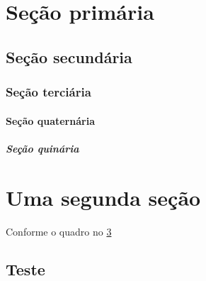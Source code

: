 \documentclass[
    12pt, %
    oneside,
    a4paper,
    english,
    brazil
]{article}
\begin{document}
\justify
\onehalfspacing

\tableofcontents

\setlength\parindent{1.25cm} %
\setlength{\parskip}{1.241pt} %

\begingroup
\section{Seção primária}
\lipsum[1-1]

\subsection{Seção secundária}
\lipsum[2-4]

\subsubsection{Seção terciária}
\lipsum[3-3]

\paragraph{Seção quaternária} %
\lipsum[4-4]

\subparagraph{Seção quinária} %
\lipsum[5-5]
\endgroup

\begingroup
\section{Uma segunda seção}

Conforme o quadro no \ref{apendice:teste}

\endgroup


\begin{appendices}

\section{Teste}\label{apendice:teste}

\lipsum[6-7]
\end{appendices}
\end{document}
